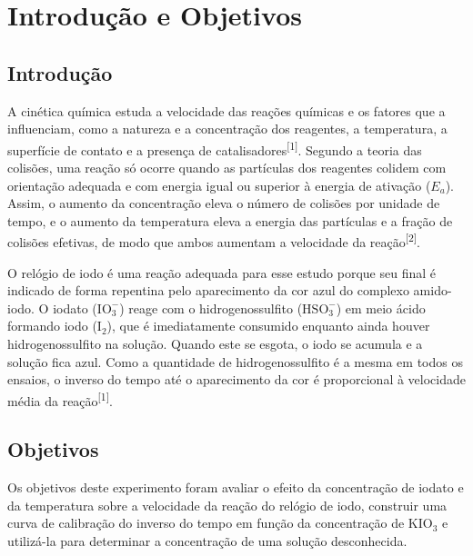 \section{Introdução e Objetivos}
    \subsection{Introdução}
    A cinética química estuda a velocidade das reações químicas e os fatores que a influenciam, como a natureza e a concentração dos reagentes, a temperatura, a superfície de contato e a presença de catalisadores\textsuperscript{[1]}. Segundo a teoria das colisões, uma reação só ocorre quando as partículas dos reagentes colidem com orientação adequada e com energia igual ou superior à energia de ativação ($E_a$). Assim, o aumento da concentração eleva o número de colisões por unidade de tempo, e o aumento da temperatura eleva a energia das partículas e a fração de colisões efetivas, de modo que ambos aumentam a velocidade da reação\textsuperscript{[2]}.

    O relógio de iodo é uma reação adequada para esse estudo porque seu final é indicado de forma repentina pelo aparecimento da cor azul do complexo amido-iodo. O iodato ($\mathrm{IO_3^-}$) reage com o hidrogenossulfito ($\mathrm{HSO_3^-}$) em meio ácido formando iodo ($\mathrm{I_2}$), que é imediatamente consumido enquanto ainda houver hidrogenossulfito na solução. Quando este se esgota, o iodo se acumula e a solução fica azul. Como a quantidade de hidrogenossulfito é a mesma em todos os ensaios, o inverso do tempo até o aparecimento da cor é proporcional à velocidade média da reação\textsuperscript{[1]}.

    \subsection{Objetivos}
    Os objetivos deste experimento foram avaliar o efeito da concentração de iodato e da temperatura sobre a velocidade da reação do relógio de iodo, construir uma curva de calibração do inverso do tempo em função da concentração de $\mathrm{KIO_3}$ e utilizá-la para determinar a concentração de uma solução desconhecida.

